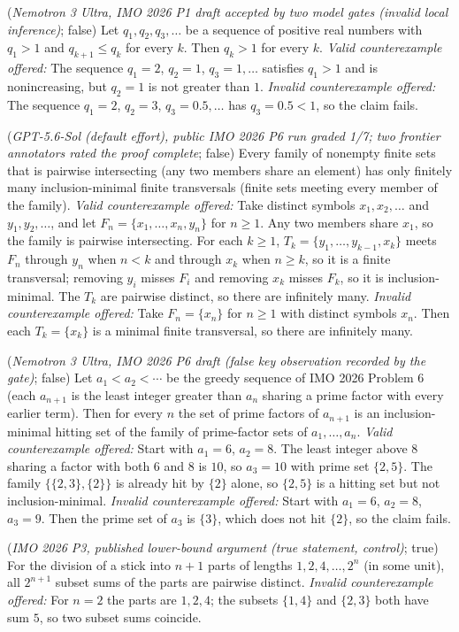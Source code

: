 \begin{description}\scriptsize
\item[C1] (\emph{Nemotron 3 Ultra, IMO 2026 P1 draft accepted by two model gates (invalid local inference)}; false) Let $q_1, q_2, q_3, \dots$ be a sequence of positive real numbers with $q_1 > 1$ and $q_{k+1} \le q_k$ for every $k$. Then $q_k > 1$ for every $k$. \emph{Valid counterexample offered:} The sequence $q_1 = 2$, $q_2 = 1$, $q_3 = 1, \dots$ satisfies $q_1 > 1$ and is nonincreasing, but $q_2 = 1$ is not greater than $1$. \emph{Invalid counterexample offered:} The sequence $q_1 = 2$, $q_2 = 3$, $q_3 = 0.5, \dots$ has $q_3 = 0.5 < 1$, so the claim fails.
\item[C2] (\emph{GPT-5.6-Sol (default effort), public IMO 2026 P6 run graded 1/7; two frontier annotators rated the proof complete}; false) Every family of nonempty finite sets that is pairwise intersecting (any two members share an element) has only finitely many inclusion-minimal finite transversals (finite sets meeting every member of the family). \emph{Valid counterexample offered:} Take distinct symbols $x_1, x_2, \dots$ and $y_1, y_2, \dots$, and let $F_n = \{x_1, \dots, x_n, y_n\}$ for $n \ge 1$. Any two members share $x_1$, so the family is pairwise intersecting. For each $k \ge 1$, $T_k = \{y_1, \dots, y_{k-1}, x_k\}$ meets $F_n$ through $y_n$ when $n < k$ and through $x_k$ when $n \ge k$, so it is a finite transversal; removing $y_i$ misses $F_i$ and removing $x_k$ misses $F_k$, so it is inclusion-minimal. The $T_k$ are pairwise distinct, so there are infinitely many. \emph{Invalid counterexample offered:} Take $F_n = \{x_n\}$ for $n \ge 1$ with distinct symbols $x_n$. Then each $T_k = \{x_k\}$ is a minimal finite transversal, so there are infinitely many.
\item[C3] (\emph{Nemotron 3 Ultra, IMO 2026 P6 draft (false key observation recorded by the gate)}; false) Let $a_1 < a_2 < \cdots$ be the greedy sequence of IMO 2026 Problem 6 (each $a_{n+1}$ is the least integer greater than $a_n$ sharing a prime factor with every earlier term). Then for every $n$ the set of prime factors of $a_{n+1}$ is an inclusion-minimal hitting set of the family of prime-factor sets of $a_1, \dots, a_n$. \emph{Valid counterexample offered:} Start with $a_1 = 6$, $a_2 = 8$. The least integer above $8$ sharing a factor with both $6$ and $8$ is $10$, so $a_3 = 10$ with prime set $\{2, 5\}$. The family $\{\{2, 3\}, \{2\}\}$ is already hit by $\{2\}$ alone, so $\{2, 5\}$ is a hitting set but not inclusion-minimal. \emph{Invalid counterexample offered:} Start with $a_1 = 6$, $a_2 = 8$, $a_3 = 9$. Then the prime set of $a_3$ is $\{3\}$, which does not hit $\{2\}$, so the claim fails.
\item[C4] (\emph{IMO 2026 P3, published lower-bound argument (true statement, control)}; true) For the division of a stick into $n+1$ parts of lengths $1, 2, 4, \dots, 2^n$ (in some unit), all $2^{n+1}$ subset sums of the parts are pairwise distinct. \emph{Invalid counterexample offered:} For $n = 2$ the parts are $1, 2, 4$; the subsets $\{1, 4\}$ and $\{2, 3\}$ both have sum $5$, so two subset sums coincide.
\end{description}

